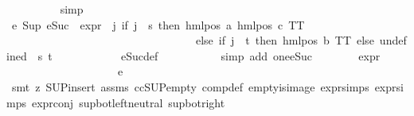 \begin{isabellebody}
\ \ \ \ \ \ \ \ \isamarkupfalse%
\ simp\isanewline
\ \ \ \ \ \ \isamarkupfalse%
\ e{}{\isacharunderscore}{\kern0pt}{}{\isacharcolon}{\kern0pt}\ {\isachardoublequoteopen}Sup\ {\isacharparenleft}{\kern0pt}{\isacharparenleft}{\kern0pt}{\isacharparenleft}{\kern0pt}eSuc\ {\isasymcirc}\ expr{\isacharunderscore}{\kern0pt}{}\ {\isasymcirc}\ {\isacharparenleft}{\kern0pt}{\isasymlambda}j{\isachardot}{\kern0pt}\ if\ j\ {\isacharequal}{\kern0pt}\ s\ then\ hml{\isacharunderscore}{\kern0pt}pos\ a\ {\isacharparenleft}{\kern0pt}hml{\isacharunderscore}{\kern0pt}pos\ c\ TT{\isacharparenright}{\kern0pt}\isanewline
\ \ \ \ \ \ \ \ \ \ \ \ \ \ \ \ \ \ \ \ \ \ \ \ \ \ \ \ \ \ \ \ \ \ else\ if\ j\ {\isacharequal}{\kern0pt}\ t\ then\ hml{\isacharunderscore}{\kern0pt}pos\ b\ TT\ else\ undefined{\isacharparenright}{\kern0pt}{\isacharparenright}{\kern0pt}\ {\isacharbackquote}{\kern0pt}\ {\isacharbraceleft}{\kern0pt}s{\isacharcomma}{\kern0pt}\ t{\isacharbraceright}{\kern0pt}{\isacharparenright}{\kern0pt}{\isacharparenright}{\kern0pt}\ {\isacharequal}{\kern0pt}\ {}{\isachardoublequoteclose}\isanewline
\ \ \ \ \ \ \ \ \isamarkupfalse%
\ eSuc{\isacharunderscore}{\kern0pt}def\ \isanewline
\ \ \ \ \ \ \ \ \isamarkupfalse%
\ {\isacharparenleft}{\kern0pt}simp\ add{\isacharcolon}{\kern0pt}\ one{\isacharunderscore}{\kern0pt}eSuc{\isacharparenright}{\kern0pt}\isanewline
\ \ \ \ \ \ \isamarkupfalse%
\ {\isachardoublequoteopen}expr{\isacharunderscore}{\kern0pt}{}\ {\isasymphi}\ {\isacharequal}{\kern0pt}\ {}{\isachardoublequoteclose}\isanewline
\ \ \ \ \ \ \ \ \isamarkupfalse%
\ {\isasymphi}\isanewline
\ \ \ \ \ \ \ \ \isamarkupfalse%
\ e{}{\isacharunderscore}{\kern0pt}{}\ \isanewline
\ \ \ \ \ \ \ \ \isamarkupfalse%
\ {\isacharparenleft}{\kern0pt}smt\ {\isacharparenleft}{\kern0pt}z{}{\isacharparenright}{\kern0pt}\ SUP{\isacharunderscore}{\kern0pt}insert\ assms{\isacharparenleft}{\kern0pt}{}{\isacharparenright}{\kern0pt}\ ccSUP{\isacharunderscore}{\kern0pt}empty\ comp{\isacharunderscore}{\kern0pt}def\ empty{\isacharunderscore}{\kern0pt}is{\isacharunderscore}{\kern0pt}image\ expr{\isacharunderscore}{\kern0pt}{}{\isachardot}{\kern0pt}simps{\isacharparenleft}{\kern0pt}{}{\isacharparenright}{\kern0pt}\ expr{\isacharunderscore}{\kern0pt}{}{\isachardot}{\kern0pt}simps{\isacharparenleft}{\kern0pt}{}{\isacharparenright}{\kern0pt}\ expr{\isacharunderscore}{\kern0pt}{}{\isacharunderscore}{\kern0pt}conj\ sup{\isacharunderscore}{\kern0pt}bot{\isachardot}{\kern0pt}left{\isacharunderscore}{\kern0pt}neutral\ sup{\isacharunderscore}{\kern0pt}bot{\isacharunderscore}{\kern0pt}right{\isacharparenright}{\kern0pt}\isanewline

\end{isabellebody}
